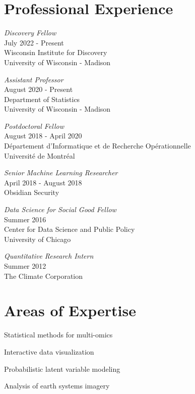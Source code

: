 \documentclass[letterpaper]{article}
\renewenvironment{itemize}{
  \begin{list}{}{
    \setlength{\leftmargin}{1.5em}
  }
}{
  \end{list}
}
\begin{document}
\section*{Professional Experience}
\begin{itemize}
\item \textit{Discovery Fellow} \\
July 2022 - Present \\
Wisconsin Institute for Discovery \\
University of Wisconsin - Madison

\item \textit{Assistant Professor}\\
August 2020 - Present \\
Department of Statistics \\
University of Wisconsin - Madison

\item \textit{Postdoctoral Fellow}\\
August 2018 - April 2020 \\
D\'epartement d'Informatique et de Recherche Op\'erationnelle \\
Universit\'e de Montr\'eal

\item \textit{Senior Machine Learning Researcher} \\
  April 2018 - August 2018 \\
  Obsidian Security
\item \textit{Data Science for Social Good Fellow} \\
  Summer 2016 \\
  Center for Data Science and Public Policy\\
  University of Chicago
\item \textit{Quantitative Research Intern} \\
  Summer 2012 \\
  The Climate Corporation
\end{itemize}

\section*{Areas of Expertise}
\begin{itemize}
  \item Statistical methods for multi-omics
  \item Interactive data visualization
  \item Probabilistic latent variable modeling
  \item Analysis of earth systems imagery
\end{itemize}
\end{document}
